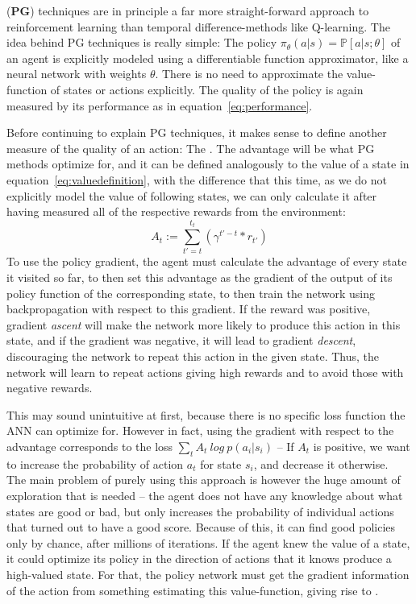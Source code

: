  (\textbf{PG}) techniques are in principle a far more straight-forward approach to reinforcement learning than temporal difference-methods like Q-learning. The idea behind PG techniques is really simple: The policy $\pi_\theta(a|s) = \mathds{P}[a|s;\theta]$ of an agent is explicitly modeled using a differentiable function approximator, like a neural network with weights $\theta$. There is no need  to approximate the value-function of states or actions explicitly. The quality of the policy is again measured by its performance as in equation~\ref{eq:performance}. 

Before continuing to explain PG techniques, it makes sense to define another measure of the quality of an action: The . The advantage will be what PG methods optimize for, and it can be defined analogously to the value of a state in equation~\ref{eq:valuedefinition}, with the difference that this time, as we do not explicitly model the value of following states, we can only calculate it after having measured all of the respective rewards from the environment:
\begin{equation}
	 A_t := \sum_{t'=t}^{t_t} ( \gamma^{t'-t} * r_{t'} ) 
\end{equation}
To use the policy gradient, the agent must calculate the advantage of every state it visited so far, to then set this advantage as the gradient of the output of its policy function of the corresponding state, to then train the network using backpropagation with respect to this gradient. If the reward was positive, gradient \textit{ascent} will make the network more likely to produce this action in this state, and if the gradient was negative, it will lead to gradient \textit{descent}, discouraging the network to repeat this action in the given state. Thus, the network will learn to repeat actions giving high rewards and to avoid those with negative rewards.

This may sound unintuitive at first, because there is no specific loss function the ANN can optimize for. However in fact, using the gradient with respect to the advantage corresponds to the loss $\sum_t A_t~log~p(a_i|s_i)$ -- If $A_t$ is positive, we want to increase the probability of action $a_t$ for state $s_i$, and decrease it otherwise.\\

\noindent The main problem of purely using this approach is however the huge amount of exploration that is needed -- the agent does not have any knowledge about what states are good or bad, but only increases the probability of individual actions that turned out to have a good score. Because of this, it can find good policies only by chance, after millions of iterations. If the agent knew the value of a state, it could optimize its policy in the direction of actions that it knows produce a high-valued state. For that, the policy network must get the gradient information of the action from something estimating this value-function, giving rise to .


